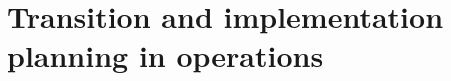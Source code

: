 \section{Transition and implementation planning in operations}
\label{sec:implementation}

%
%
%
%
%
